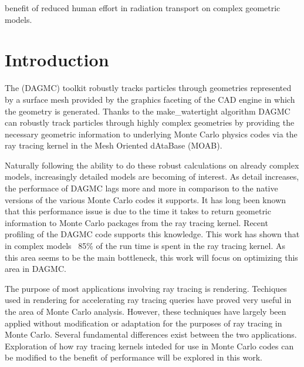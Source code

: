 \documentclass[10pt, a4paper]{article}
\begin{document}
benefit of reduced human effort in radiation transport on complex geometric models.

\section{Introduction}%



The (DAGMC) toolkit \cite{dagmc_2009} robustly tracks particles through geometries represented by a surface mesh provided by the graphics faceting of the CAD engine in which the geometry is generated. Thanks to the make\_watertight algorithm\cite{make_watertight_smith_2010} DAGMC can robustly track particles through highly complex geometries by providing the necessary geometric information to underlying Monte Carlo physics codes via the ray tracing kernel in the Mesh Oriented dAtaBase (MOAB)\cite{moab}.

Naturally following the ability to do these robust calculations on already complex models, increasingly detailed models are becoming of interest. As detail increases, the performace of DAGMC lags more and more in comparison to the native versions of the various Monte Carlo codes it supports. It has long been known that this performance issue is due to the time it takes to return geometric information to Monte Carlo packages from the ray tracing kernel. Recent profiling of the DAGMC code supports this knowledge. This work has shown that in complex models ~85\% of the run time is spent in the ray tracing kernel. As this area seems to be the main bottleneck, this work will focus on optimizing this area in DAGMC.

The purpose of most applications involving ray tracing is rendering. Techiques used in rendering for accelerating ray tracing queries have proved very useful in the area of Monte Carlo analysis. However, these techniques have largely been applied without modification or adaptation for the purposes of ray tracing in Monte Carlo. Several fundamental differences exist between the two applications. Exploration of how ray tracing kernels inteded for use in Monte Carlo codes can be modified to the benefit of performance will be explored in this work.
\end{document}
